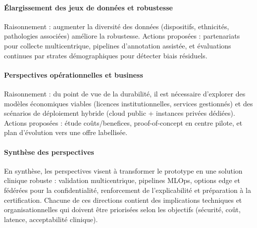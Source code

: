 \paragraph{Élargissement des jeux de données et robustesse}  
Raisonnement : augmenter la diversité des données (dispositifs, ethnicités, pathologies associées) améliore la robustesse. Actions proposées : partenariats pour collecte multicentrique, pipelines d'annotation assistée, et évaluations continues par strates démographiques pour détecter biais résiduels.

\paragraph{Perspectives opérationnelles et business}  
Raisonnement : du point de vue de la durabilité, il est nécessaire d'explorer des modèles économiques viables (licences institutionnelles, services gestionnés) et des scénarios de déploiement hybride (cloud public + instances privées dédiées). Actions proposées : étude coûts/benefices, proof-of-concept en centre pilote, et plan d'évolution vers une offre labellisée.

\paragraph{Synthèse des perspectives}  
En synthèse, les perspectives visent à transformer le prototype en une solution clinique robuste : validation multicentrique, pipelines MLOps, options edge et fédérées pour la confidentialité, renforcement de l'explicabilité et préparation à la certification. Chacune de ces directions contient des implications techniques et organisationnelles qui doivent être priorisées selon les objectifs (sécurité, coût, latence, acceptabilité clinique).
